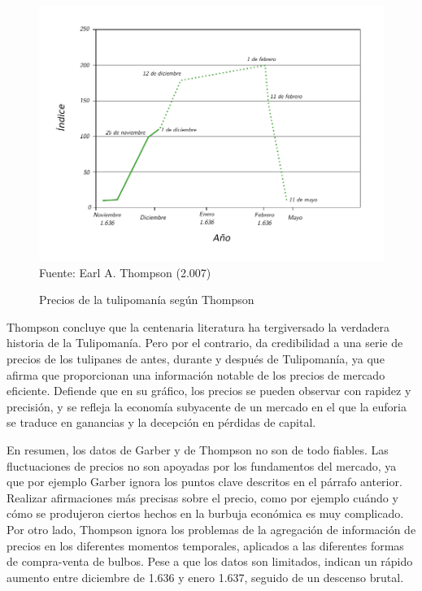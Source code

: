 \begin{figure}[!h] 
\caption{Precios de la tulipomanía según Thompson} 
\centering \includegraphics[width=150mm]{capitulos/graficos/Thompson} 
\label{fig:Precios de la tulipomanía según Thompson} 
	\footnotesize
	Fuente:  Earl A. Thompson (2.007)
\end{figure}

Thompson concluye que la centenaria literatura ha tergiversado la verdadera historia de la Tulipomanía. Pero por el contrario, da credibilidad a una serie de precios de los tulipanes de antes, durante y después de Tulipomanía, ya que afirma que proporcionan una información notable de los precios de mercado eficiente. Defiende que en su gráfico, los precios se pueden observar con rapidez y precisión, y se refleja la economía subyacente de un mercado en el que la euforia se traduce en ganancias y la decepción en pérdidas de capital.

En resumen, los datos de Garber y de Thompson no son de todo fiables. Las fluctuaciones de precios no son apoyadas por los fundamentos del mercado, ya que por ejemplo Garber ignora los puntos clave descritos en el párrafo anterior. Realizar afirmaciones más precisas sobre el precio, como por ejemplo cuándo y cómo se produjeron ciertos hechos en la burbuja económica es muy complicado. Por otro lado, Thompson ignora los problemas de la agregación de información de precios en los diferentes momentos temporales, aplicados a las diferentes formas de compra-venta de bulbos. Pese a que los datos son limitados, indican un rápido aumento entre diciembre de 1.636 y enero 1.637, seguido de un descenso brutal.

